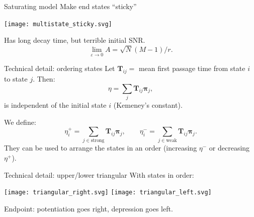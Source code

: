 \documentclass[final]{beamer}%
\newcommand{\eq}{\boldsymbol{\pi}}
\newcommand{\fpt}{\mathbf{T}}
\begin{document}

\begin{frame}{Saturating model}
%
 Make end states ``sticky''
 \begin{center}
   \texttt{[image: multistate\_sticky.svg]}
 \end{center}
 Has long decay time, but terrible initial SNR.
 \begin{equation*}
   \lim_{\varepsilon\to0}A=\sqrt{N}(M-1)/r.
 \end{equation*}
%
\end{frame}


\begin{frame}[label=fr_tech]{Technical detail: ordering states}
%
 Let $\fpt_{ij}=$ mean first passage time from state $i$ to state $j$.
 Then:
 \begin{equation*}
   \eta = \sum_j \fpt_{ij} \eq_j,
 \end{equation*}
 is independent of the initial state $i$
 (Kemeney's constant).\\ 

 \vp We define:
 \begin{equation*}
   \eta^+_i = \sum_{j\in\text{strong}} \fpt_{ij} \eq_j,
   \qquad
   \eta^-_i = \sum_{j\in\text{weak}} \fpt_{ij} \eq_j.
 \end{equation*}
 They can be used to arrange the states in an order (increasing $\eta^-$ or decreasing $\eta^+$).
 \hyperlink{fr_areaproof}{}
%
\end{frame}


\begin{frame}{Technical detail: upper/lower triangular}
%
 With states in order:
 \begin{center}
   \texttt{[image: triangular\_right.svg]}
   \hp \hp \hp
   \texttt{[image: triangular\_left.svg]}
 \end{center}
 Endpoint: potentiation goes right, depression goes left.

 \hyperlink{fr_areaproof}{}
%
\end{frame}
\end{document}
